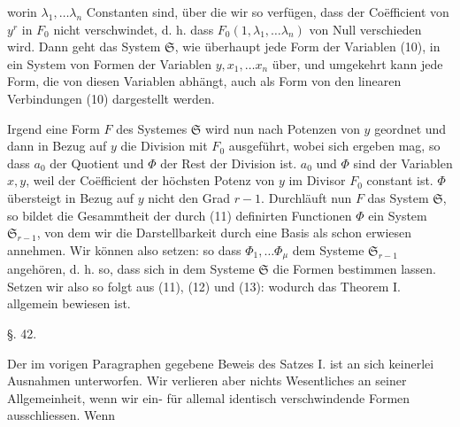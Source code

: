 worin $\lambda_1,\ldots\lambda_n$ Constanten sind, \"uber die wir so verf\"ugen, dass der Co\"efficient von $y^r$ in $F_0$ nicht verschwindet, d. h. dass $F_0(1,\lambda_1,\ldots\lambda_n)$ von Null verschieden wird. Dann geht das System $\mathfrak S$, wie \"uberhaupt jede Form der Variablen (10), in ein System von Formen der Variablen $y,x_1,\ldots x_n$ \"uber, und umgekehrt kann jede Form, die von diesen Variablen abh\"angt, auch als Form von den linearen Verbindungen (10) dargestellt werden.

Irgend eine Form $F$ des Systemes $\mathfrak S$ wird nun nach Potenzen von $y$ geordnet und dann in Bezug auf $y$ die Division mit $F_0$ ausgef\"uhrt, wobei sich
ergeben mag, so dass $a_0$ der Quotient und $\Phi$ der Rest der Division ist. $a_0$ und $\Phi$ sind  der Variablen $x, y$, weil der Co\"efficient der h\"ochsten Potenz von $y$ im Divisor $F_0$ constant ist. $\Phi$ \"ubersteigt in Bezug auf $y$ nicht den Grad $r-1$. Durchl\"auft nun $F$ das System $\mathfrak S$, so bildet die Gesammtheit der durch (11) definirten Functionen $\Phi$ ein System $\mathfrak S_{r-1}$, von dem wir die Darstellbarkeit durch eine Basis als schon erwiesen annehmen. Wir k\"onnen also setzen:
so dass $\Phi_1,\ldots\Phi_\mu$ dem Systeme $\mathfrak S_{r-1}$ angeh\"oren, d. h. so, dass sich in dem Systeme $\mathfrak S$ die Formen
bestimmen lassen. Setzen wir also
so folgt aus (11), (12) und (13):
wodurch das Theorem I. allgemein bewiesen ist.

\begin{center}
\S. 42.\\
\end{center}

Der im vorigen Paragraphen gegebene Beweis des Satzes I. ist an sich keinerlei Ausnahmen unterworfen. Wir verlieren aber nichts Wesentliches an seiner Allgemeinheit, wenn wir ein- f\"ur allemal identisch verschwindende Formen ausschliessen. Wenn

